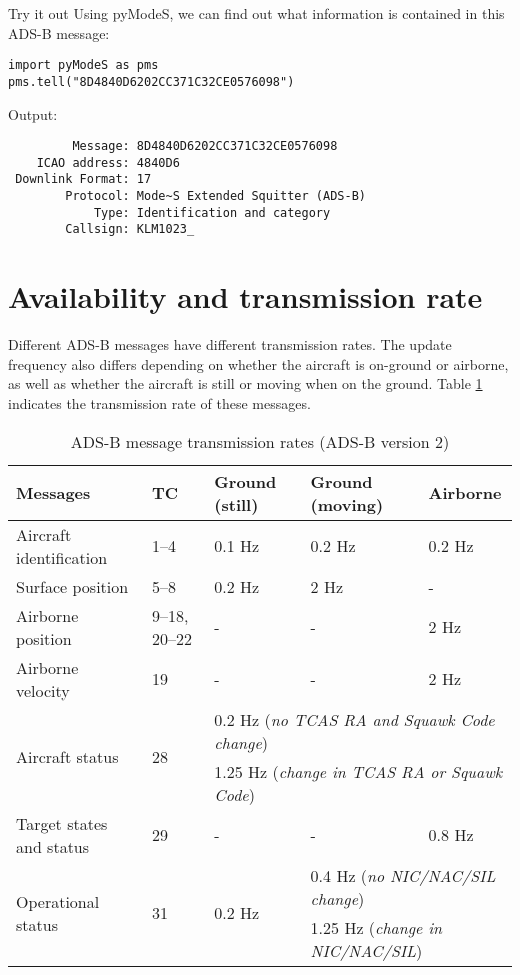 \begin{notebox}{Try it out}
  Using pyModeS, we can find out what information is contained in this ADS-B message:

\begin{verbatim}
import pyModeS as pms
pms.tell("8D4840D6202CC371C32CE0576098")
\end{verbatim}

Output:

\begin{verbatim}
         Message: 8D4840D6202CC371C32CE0576098 
    ICAO address: 4840D6 
 Downlink Format: 17 
        Protocol: Mode~S Extended Squitter (ADS-B) 
            Type: Identification and category 
        Callsign: KLM1023_ 
\end{verbatim}
  

\end{notebox}


\section{Availability and transmission rate}

Different ADS-B messages have different transmission rates. The update frequency also differs depending on whether the aircraft is on-ground or airborne, as well as whether the aircraft is still or moving when on the ground. Table \ref{tb:adsb-transmission-rate} indicates the transmission rate of these messages.

\begin{table}[ht]
  \footnotesize
  \centering
  \caption{ADS-B message transmission rates (ADS-B version 2)}
  \label{tb:adsb-transmission-rate}
  \begin{tabular}{|l|l|l|l|l|}
  \hline
  \textbf{Messages} & \textbf{TC} & \textbf{Ground (still)} & \textbf{Ground (moving)} & \textbf{Airborne} \\ \hline
  Aircraft identification & 1--4 & 0.1 Hz & 0.2 Hz & 0.2 Hz \\ \hline
  Surface position & 5--8 & 0.2 Hz & 2 Hz & - \\ \hline
  Airborne position & 9--18, 20--22 & - & - & 2 Hz \\ \hline
  Airborne velocity & 19 & - & - & 2 Hz \\ \hline
  \multirow{2}{*}{Aircraft status} & \multirow{2}{*}{28} & \multicolumn{3}{l|}{0.2 Hz (\textit{no TCAS RA and Squawk Code change})} \\ \cline{3-5} 
   &  & \multicolumn{3}{l|}{1.25 Hz (\textit{change in TCAS RA or Squawk Code})} \\ \hline
  Target states and status & 29 & - & - & 0.8 Hz \\ \hline
  \multirow{2}{*}{Operational status} & \multirow{2}{*}{31} & \multirow{2}{*}{0.2 Hz} & \multicolumn{2}{l|}{0.4 Hz (\textit{no NIC/NAC/SIL change})} \\ \cline{4-5} 
   &  &  & \multicolumn{2}{l|}{1.25 Hz (\textit{change in NIC/NAC/SIL})} \\ \hline
  \end{tabular}
\end{table}

